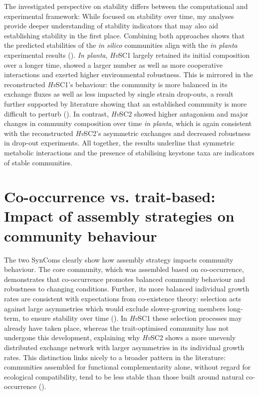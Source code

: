 The investigated perspective on stability differs between the computational and experimental framework: While \cite{mahdi_low_2026} focused on stability over time, my analyses provide deeper understanding of stability indicators that may also aid establishing stability in the first place. Combining both approaches shows that the predicted stabilities of the \textit{in silico} communities align with the \textit{in planta} experimental results (\cite{mahdi_low_2026}). \textit{In planta}, \textit{Hv}SC1 largely retained its initial composition over a longer time, showed a larger number as well as more cooperative interactions and exerted higher environmental robustness. This is mirrored in the reconstructed \textit{Hv}SC1’s behaviour: the community is more balanced in its exchange fluxes as well as less impacted by single strain drop-outs, a result further supported by literature showing that an established community is more difficult to perturb (\cite{carlstrom_synthetic_2019}). In contrast, \textit{Hv}SC2 showed higher antagonism and major changes in community composition over time\textit{ in planta}, which is again consistent with the reconstructed \textit{Hv}SC2’s asymmetric exchanges and decreased robustness in drop-out experiments. All together, the results underline that symmetric metabolic interactions and the presence of stabilising keystone taxa are indicators of stable communities.

\section{Co-occurrence vs. trait-based: Impact of assembly strategies on community behaviour}\label{sec:assembly_strat_discussion}
The two SynComs clearly show how assembly strategy impacts community behaviour. The core community, which was assembled based on co-occurrence, demonstrates that co-occurrence promotes balanced community behaviour and robustness to changing conditions. Further, its more balanced individual growth rates are consistent with expectations from co-existence theory: selection acts against large asymmetries which would exclude slower-growing members long-term, to ensure stability over time (\cite{chesson_mechanisms_2000}). In \textit{Hv}SC1 these selection processes may already have taken place, whereas the trait-optimised community has not undergone this development, explaining why \textit{Hv}SC2 shows a more unevenly distributed exchange network with larger asymmetries in its individual growth rates. This distinction links nicely to a broader pattern in the literature: communities assembled for functional complementarity alone, without regard for ecological compatibility, tend to be less stable than those built around natural co-occurrence (\cite{de_souza_microbiome_2020}).
\\


